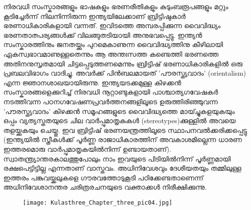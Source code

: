 \label{ch3box2} %
\begin{tcolorbox}[%
 breakable, %
  arc=0mm, 
  left=1pt, right = 1pt, 
  boxrule=0mm,
  colback = {blue!10}, %
] 
നിരവധി സംസ്കാരങ്ങളും ഭാഷകളും ഭരണരീതികളും കുടുംബരൂപങ്ങളും മറ്റും കൂടിച്ചേർന്ന് നിലനിന്നിരുന്ന ഇന്ത്യയിലേക്കാണ് ബ്രിട്ടിഷുകാർ ഭരണാധികാരികളായി വന്നത്. ഇവിടത്തെ അമ്പരപ്പിക്കുന്ന വൈവിദ്ധ്യം ഭരണതാത്പര്യങ്ങൾക്ക് വിലങ്ങുതടിയായി അനുഭവപ്പെട്ടു. ഇന്ത്യൻ സംസ്കാരത്തിനും ജനതയ്ക്കും പുറമെകാണുന്ന വൈവിദ്ധ്യത്തിനു കീഴിലായി ഏകസ്വഭാവമാണുള്ളതെന്നും ആ അന്തഃസത്ത കണ്ടെത്തി ഭരണത്തെ അതിനനുസൃതമായി ചിട്ടപ്പെടുത്തണമെന്നും ബ്രിട്ടിഷ് ഭരണാധികാരികളിൽ ഒരു പ്രബലവിഭാഗം വാദിച്ചു. അവർക്ക് പിൻബലമായത് 'പൗരസ്ത്യവാദം' (orientalism) എന്ന ജ്ഞാനശാഖയായിരുന്നു. ഇന്ത്യയടക്കമുള്ള കിഴക്കൻ സംസ്കാരങ്ങളെക്കുറിച്ച് നിരവധി നൂറ്റാണ്ടുകളായി പാശ്ചാത്യഗവേഷകർ നടത്തിവന്ന പഠനഗവേഷണപ്രവർത്തനങ്ങളിലൂടെ ഉരുത്തിരിഞ്ഞുവന്ന 'പൗരസ്ത്യവാദം' കിഴക്കൻ സമൂഹങ്ങളുടെ വൈവിദ്ധ്യത്തെ മായ്ച്ചുകളയുകയും ഒപ്പം വ്യത്യസ്തതയുടെ ചില വാർപ്പുമാതൃകകൾ (stereotypes)ക്കുള്ളിൽ അവയെ തളയ്ക്കുകയും ചെയ്തു. ഇവ ബ്രിട്ടിഷ് ഭരണയന്ത്രത്തിലൂടെ സ്ഥാപനവൽക്കരിക്കപ്പെട്ടു (ഇന്ത്യയിൽ സ്ത്രീകൾക്ക് പൂർണ്ണ രാജാധികാരത്തിന് അവകാശമില്ലെന്ന ധാരണ ഇത്തരമൊരു വാർപ്പുമാതൃകയിൽനിന്ന് ഉണ്ടായതാണ്). സ്വാതന്ത്ര്യാന്തരകാലത്തുപോലും നാം ഇവയുടെ പിടിയിൽനിന്ന് പൂർണ്ണമായി രക്ഷപെട്ടിട്ടില്ല എന്നതാണ് വാസ്തവം. അധിനിവേശവും ദേശീയതയും തമ്മിലുള്ള ഇത്തരം പങ്കുവയ്ക്കലുകളെ ഗൗരവത്തോടുകൂടി പഠിക്കേണ്ടതാണെന്ന് അധിനിവേശാനന്തര ചരിത്രരചനയുടെ വക്താക്കൾ നിരീക്ഷിക്കുന്നു.
\end{tcolorbox}

\begin{figure}
\begin{center}
\texttt{[image: Kulasthree\_Chapter\_three\_pic04.jpg]}
\end{center}
\end{figure}

